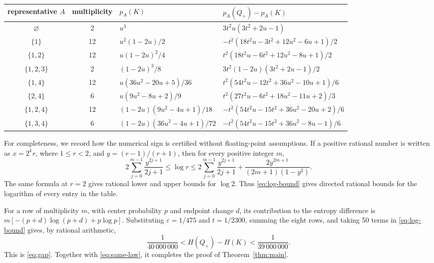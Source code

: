\documentclass[11pt]{article}
\begin{document}
\begin{center}
\setlength{\tabcolsep}{3.5pt}
\renewcommand{\arraystretch}{1.25}
\scriptsize
\begin{tabular}{@{}ccll@{}}
\toprule
representative $A$&multiplicity&$p_A(K)$&$p_A(Q_+)-p_A(K)$\\
\midrule
\(\varnothing\)&2
 &\(u^3\)
 &\(3t^2u(3t^2+2u-1)\)\\
\(\{1\}\)&12
 &\(u^2(1-2u)/2\)
 &\(-t^2(18t^2u-3t^2+12u^2-6u+1)/2\)\\
\(\{1,2\}\)&12
 &\(u(1-2u)^2/4\)
 &\(t^2(18t^2u-6t^2+12u^2-8u+1)/2\)\\
\(\{1,2,3\}\)&2
 &\((1-2u)^3/8\)
 &\(3t^2(1-2u)(3t^2+2u-1)/2\)\\
\(\{1,4\}\)&12
 &\(u(36u^2-20u+5)/36\)
 &\(t^2(54t^2u-12t^2+36u^2-10u+1)/6\)\\
\(\{2,4\}\)&6
 &\(u(9u^2-8u+2)/9\)
 &\(t^2(27t^2u-6t^2+18u^2-11u+2)/3\)\\
\(\{1,2,4\}\)&12
 &\((1-2u)(9u^2-4u+1)/18\)
 &\(-t^2(54t^2u-15t^2+36u^2-20u+2)/6\)\\
\(\{1,3,4\}\)&6
 &\((1-2u)(36u^2-4u+1)/72\)
 &\(-t^2(54t^2u-15t^2+36u^2-8u-1)/6\)\\
\bottomrule
\end{tabular}
\end{center}

For completeness, we record how the numerical sign is certified without
floating-point assumptions.  If a positive rational number is written as
$x=2^kr$, where $1\le r<2$, and $y=(r-1)/(r+1)$, then for every positive
integer $m$,
\begin{equation}\label{eq:log-bound}
 2\sum_{j=0}^{m-1}\frac{y^{2j+1}}{2j+1}
 \le \log r\le
 2\sum_{j=0}^{m-1}\frac{y^{2j+1}}{2j+1}
 +\frac{2y^{2m+1}}{(2m+1)(1-y^2)}.
\end{equation}
The same formula at $r=2$ gives rational lower and upper bounds for
$\log2$.  Thus \eqref{eq:log-bound} gives directed rational bounds for the
logarithm of every entry in the table.

For a row of multiplicity $m$, with center probability $p$ and endpoint change
$d$, its contribution to the entropy difference is
$m[-(p+d)\log(p+d)+p\log p]$.  Substituting
$\varepsilon=1/475$ and $t=1/2300$, summing the eight rows, and taking 50
terms in \eqref{eq:log-bound} gives, by rational arithmetic,
\[
 \frac1{40\,000\,000}
 <H(Q_+)-H(K)
 <\frac1{39\,000\,000}.
\]
This is \eqref{eq:gap}.  Together with \eqref{eq:same-law}, it completes the
proof of Theorem~\ref{thm:main}.
\end{document}
